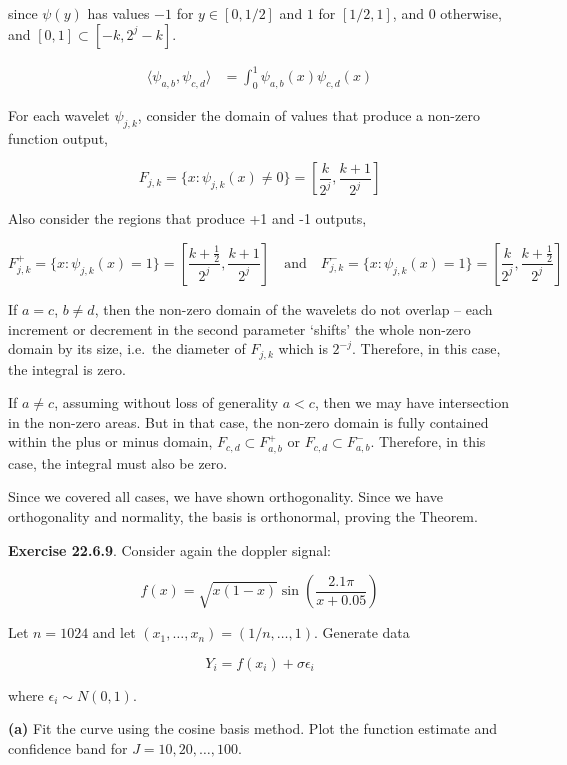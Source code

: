 since \(\psi(y)\) has values \(-1\) for \(y \in [0, 1/2]\) and \(1\) for
\([1/2, 1]\), and 0 otherwise, and \([0, 1] \subset [-k, 2^{j} - k]\).

\begin{align*}
\langle \psi_{a, b}, \psi_{c, d} \rangle &= \int_{0}^{1} \psi_{a, b}(x) \psi_{c, d}(x)
\end{align*}

For each wavelet \(\psi_{j, k}\), consider the domain of values that
produce a non-zero function output,

\[F_{j, k} = \{ x : \psi_{j, k}(x) \neq 0 \} = \left[\frac{k}{2^{j}}, \frac{k + 1}{2^{j}} \right]\]

Also consider the regions that produce +1 and -1 outputs,

\[F_{j, k}^+ = \{ x : \psi_{j, k}(x) = 1 \} = \left[\frac{k + \frac{1}{2}}{2^{j}}, \frac{k + 1}{2^{j}} \right]
\quad \text{and} \quad
F_{j, k}^- = \{ x : \psi_{j, k}(x) = 1 \} = \left[\frac{k}{2^{j}}, \frac{k + \frac{1}{2}}{2^{j}} \right]\]

If \(a = c\), \(b \neq d\), then the non-zero domain of the wavelets do
not overlap -- each increment or decrement in the second parameter
`shifts' the whole non-zero domain by its size, i.e.~the diameter of
\(F_{j, k}\) which is \(2^{-j}\). Therefore, in this case, the integral
is zero.

If \(a \neq c\), assuming without loss of generality \(a < c\), then we
may have intersection in the non-zero areas. But in that case, the
non-zero domain is fully contained within the plus or minus domain,
\(F_{c, d} \subset F_{a, b}^+\) or \(F_{c, d} \subset F_{a, b}^-\).
Therefore, in this case, the integral must also be zero.

Since we covered all cases, we have shown orthogonality. Since we have
orthogonality and normality, the basis is orthonormal, proving the
Theorem.

\textbf{Exercise 22.6.9}. Consider again the doppler signal:

\[ f(x) = \sqrt{x (1 - x)} \sin \left( \frac{2.1 \pi}{x + 0.05} \right) \]

Let \(n = 1024\) and let \((x_{1}, \dots, x_{n}) = (1/n, \dots, 1)\).
Generate data

\[ Y_{i} = f(x_{i}) + \sigma \epsilon_{i} \]

where \(\epsilon_{i} \sim N(0, 1)\).

\textbf{(a)} Fit the curve using the cosine basis method. Plot the
function estimate and confidence band for \(J = 10, 20, \dots, 100\).

